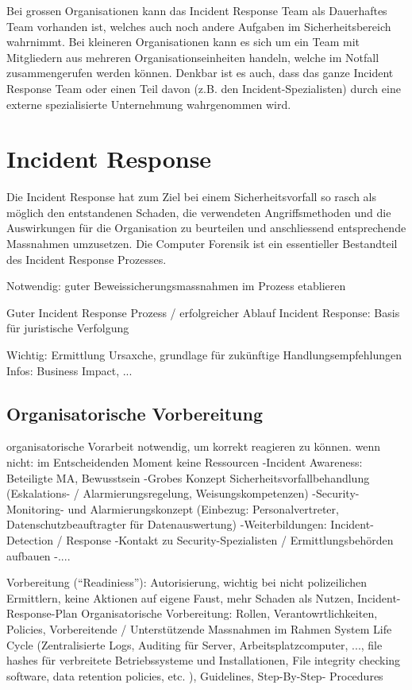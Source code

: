 Bei grossen Organisationen kann das Incident Response Team als Dauerhaftes Team vorhanden ist, welches auch noch andere Aufgaben im Sicherheitsbereich wahrnimmt. Bei kleineren Organisationen kann es sich um ein Team mit Mitgliedern aus mehreren Organisationseinheiten handeln, welche im Notfall zusammengerufen werden können. Denkbar ist es auch, dass das ganze Incident Response Team oder einen Teil davon (z.B. den Incident-Spezialisten) durch eine externe spezialisierte Unternehmung wahrgenommen wird.


\section{Incident Response}
Die Incident Response hat zum Ziel bei einem Sicherheitsvorfall so rasch als möglich den entstandenen Schaden, die verwendeten Angriffsmethoden und die Auswirkungen für die Organisation zu beurteilen und anschliessend entsprechende Massnahmen umzusetzen. Die Computer Forensik ist ein essentieller Bestandteil des Incident Response Prozesses.




Notwendig: guter Beweissicherungsmassnahmen im Prozess etablieren

Guter Incident Response Prozess / erfolgreicher Ablauf Incident Response: Basis für juristische Verfolgung


Wichtig: Ermittlung Ursaxche, grundlage für zukünftige Handlungsempfehlungen
Infos: Business Impact, ...

\subsection{Organisatorische Vorbereitung}
organisatorische Vorarbeit notwendig, um korrekt reagieren zu können. wenn nicht: im Entscheidenden Moment keine Ressourcen
-Incident Awareness: Beteiligte MA, Bewusstsein
-Grobes Konzept Sicherheitsvorfallbehandlung (Eskalations- / Alarmierungsregelung, Weisungskompetenzen)
-Security-Monitoring- und Alarmierungskonzept (Einbezug: Personalvertreter, Datenschutzbeauftragter für Datenauswertung)
-Weiterbildungen: Incident-Detection / Response
-Kontakt zu Security-Spezialisten / Ermittlungsbehörden aufbauen
-....

Vorbereitung ("`Readiniess"'): Autorisierung, wichtig bei nicht polizeilichen Ermittlern, keine Aktionen auf eigene Faust, mehr Schaden als Nutzen, Incident-Response-Plan
Organisatorische Vorbereitung: Rollen, Verantowrtlichkeiten, Policies, Vorbereitende / Unterstützende Massnahmen im Rahmen System Life Cycle (Zentralisierte Logs, Auditing für Server, Arbeitsplatzcomputer, ..., file hashes für verbreitete Betriebssysteme und Installationen, File integrity checking software, data retention policies, etc. ), Guidelines, Step-By-Step- Procedures

